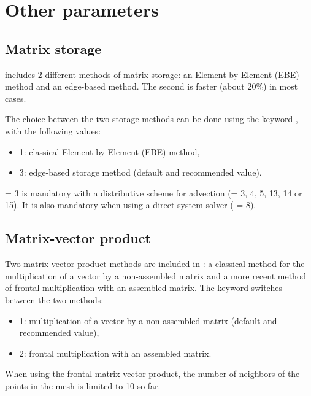 \section{Other parameters}

\subsection{Matrix storage}

 includes 2 different methods of matrix storage:
an Element by Element (EBE) method and an edge-based method.
The second is faster (about 20\%) in most cases.

The choice between the two storage methods can be done using the keyword
, with the following values:

\begin{itemize}
\item 1: classical Element by Element (EBE) method,

\item 3: edge-based storage method (default and recommended value).
\end{itemize}

 = 3 is mandatory with a distributive scheme
for advection (= 3, 4, 5, 13, 14 or 15).
It is also mandatory when using a direct system solver ( = 8).


\subsection{Matrix-vector product}

Two matrix-vector product methods are included in :
a classical method for the multiplication of a vector by a non-assembled matrix
and a more recent method of frontal multiplication with an assembled matrix.
The keyword  switches between the two methods:

\begin{itemize}
\item 1: multiplication of a vector by a non-assembled matrix
(default and recommended value),

\item 2: frontal multiplication with an assembled matrix.
\end{itemize}

When using the frontal matrix-vector product,
the number of neighbors of the points in the mesh is limited to 10 so far.

